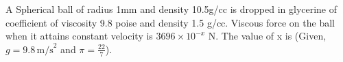 \item A Spherical ball of radius 1mm and density 10.5g/cc is dropped in glycerine of coefficient of viscosity 9.8 poise and density 1.5 g/cc. Viscous force on the ball when it attains constant velocity is $3696 \times 10^{-x}$ N. The value of x is (Given, $g = 9.8 \, \text{m/s}^{2}$ and $\pi = \frac{22}{7}$).